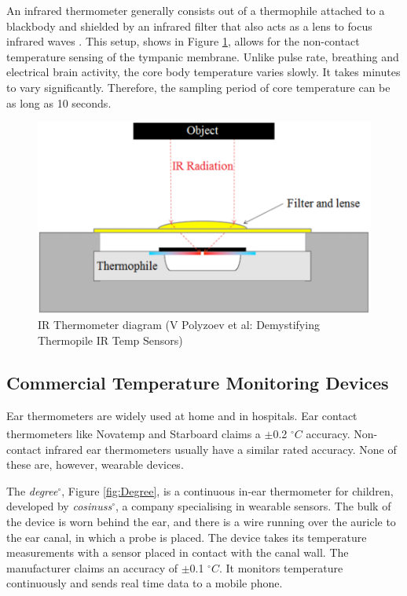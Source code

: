 \medskip

An infrared thermometer generally consists out of a thermophile attached to a blackbody and shielded by an infrared filter that also acts as a lens to focus infrared waves \citep{irTempSensors}. This setup, shows in Figure \ref{fig:IR_Thermometer}, allows for the non-contact temperature sensing of the tympanic membrane. Unlike pulse rate, breathing and electrical brain activity, the core body temperature varies slowly. It takes minutes to vary significantly. Therefore, the sampling period of core temperature can be as long as 10 seconds.

\medskip

\begin{figure}
   \centering
   \includegraphics[scale=0.5]{figs/IR_Thermometer}
   \caption{IR Thermometer diagram (V Polyzoev et al: Demystifying Thermopile IR Temp Sensors)}
   \label{fig:IR_Thermometer}
\end{figure}

\subsection{Commercial Temperature Monitoring Devices}
Ear thermometers are widely used at home and in hospitals. Ear contact thermometers like Novatemp\textsuperscript \textregistered{} and Starboard\textsuperscript \textregistered{} claims a $\pm$0.2 $^{\circ}C$ accuracy. Non-contact infrared ear thermometers usually have a similar rated accuracy. None of these are, however, wearable devices. 

\medskip
 
The \textit{degree}$^{\circ}$, Figure \ref{fig:Degree}, is a continuous in-ear thermometer for children, developed by \textit{cosinuss}$^{\circ}$, a company specialising in wearable sensors. The bulk of the device is worn behind the ear, and there is a wire running over the auricle to the ear canal, in which a probe is placed. The device takes its temperature measurements with a sensor placed in contact with the canal wall. The manufacturer claims an accuracy of $\pm$0.1 $^{\circ}C$. It monitors temperature continuously and sends real time data to a mobile phone.

